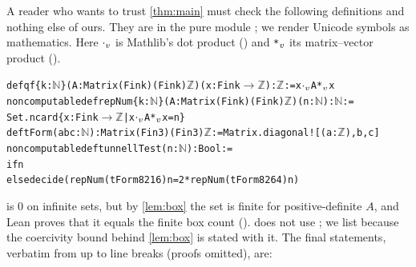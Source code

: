 \documentclass[10pt]{amsart}
\theoremstyle{plain}
\theoremstyle{definition}
\theoremstyle{remark}
\numberwithin{equation}{section}
\begin{document}
A reader who wants to trust \cref{thm:main} must check the following definitions and nothing else of ours.
They are in the pure module ; we render Unicode symbols as mathematics. Here
\texttt{\(\cdot\sb{v}\)} is Mathlib's dot product () and \texttt{*\(\sb{v}\)} its matrix--vector
product ().
\begin{alltt}\footnotesize
def qf \{k : \(\mathbb{N}\)\} (A : Matrix (Fin k) (Fin k) \(\mathbb{Z}\)) (x : Fin k \(\to\) \(\mathbb{Z}\)) : \(\mathbb{Z}\) := x \(\cdot\sb{v}\) A *\(\sb{v}\) x
noncomputable def repNum \{k : \(\mathbb{N}\)\} (A : Matrix (Fin k) (Fin k) \(\mathbb{Z}\)) (n : \(\mathbb{N}\)) : \(\mathbb{N}\) :=
  Set.ncard \{x : Fin k \(\to\) \(\mathbb{Z}\) | x \(\cdot\sb{v}\) A *\(\sb{v}\) x = n\}
def tForm (a b c : \(\mathbb{N}\)) : Matrix (Fin 3) (Fin 3) \(\mathbb{Z}\) := Matrix.diagonal ![(a : \(\mathbb{Z}\)), b, c]
noncomputable def tunnellTest (n : \(\mathbb{N}\)) : Bool :=
  if n %
  else decide (repNum (tForm 8 2 16) n = 2 * repNum (tForm 8 2 64) n)
\end{alltt}
 is $0$ on infinite sets, but by \cref{lem:box} the set is finite for positive-definite $A$, and
Lean proves that it equals the finite box count ().  does not use
; we list  because the coercivity bound behind \cref{lem:box} is stated with it. The final statements,
verbatim from  up to line breaks (proofs omitted), are:
\end{document}
